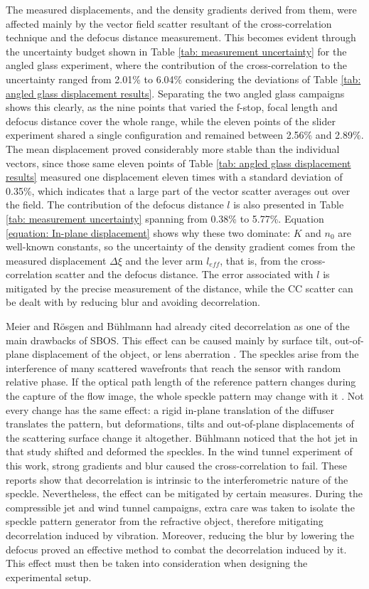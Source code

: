 The measured displacements, and the density gradients derived from them, were affected mainly by the vector field scatter resultant of the cross-correlation technique and the defocus distance measurement. This becomes evident through the uncertainty budget shown in Table \ref{tab: measurement uncertainty} for the angled glass experiment, where the contribution of the cross-correlation to the uncertainty ranged from 2.01\% to 6.04\% considering the deviations of Table \ref{tab: angled glass displacement results}. Separating the two angled glass campaigns shows this clearly, as the nine points that varied the f-stop, focal length and defocus distance cover the whole range, while the eleven points of the slider experiment shared a single configuration and remained between 2.56\% and 2.89\%. The mean displacement proved considerably more stable than the individual vectors, since those same eleven points of Table \ref{tab: angled glass displacement results} measured one displacement eleven times with a standard deviation of 0.35\%, which indicates that a large part of the vector scatter averages out over the field. The contribution of the defocus distance $l$ is also presented in Table \ref{tab: measurement uncertainty} spanning from 0.38\% to 5.77\%. Equation \ref{equation: In-plane displacement} shows why these two dominate: $K$ and $n_0$ are well-known constants, so the uncertainty of the density gradient comes from the measured displacement $\Delta\xi$ and the lever arm $l_{eff}$, that is, from the cross-correlation scatter and the defocus distance. The error associated with $l$ is mitigated by the precise measurement of the distance, while the CC scatter can be dealt with by reducing blur and avoiding decorrelation.

Meier and Rösgen \cite{Meier&Roesgen2013} and Bühlmann \cite{Buhlmann2020} had already cited decorrelation as one of the main drawbacks of SBOS. This effect can be caused mainly by surface tilt, out-of-plane displacement of the object, or lens aberration \cite{Li&CHiang1986}. The speckles arise from the interference of many scattered wavefronts that reach the sensor with random relative phase. If the optical path length of the reference pattern changes during the capture of the flow image, the whole speckle pattern may change with it \cite{Buhlmann2020, Li&CHiang1986}. Not every change has the same effect: a rigid in-plane translation of the diffuser translates the pattern, but deformations, tilts and out-of-plane displacements of the scattering surface change it altogether. Bühlmann noticed that the hot jet in that study shifted and deformed the speckles. In the wind tunnel experiment of this work, strong gradients and blur caused the cross-correlation to fail. These reports show that decorrelation is intrinsic to the interferometric nature of the speckle. Nevertheless, the effect can be mitigated by certain measures. During the compressible jet and wind tunnel campaigns, extra care was taken to isolate the speckle pattern generator from the refractive object, therefore mitigating decorrelation induced by vibration. Moreover, reducing the blur by lowering the defocus proved an effective method to combat the decorrelation induced by it. This effect must then be taken into consideration when designing the experimental setup.


